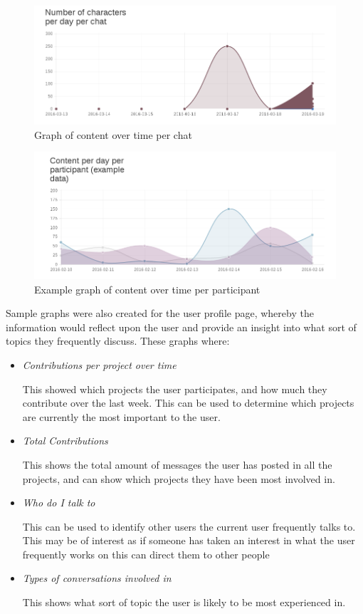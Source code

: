 \documentclass{l4proj}
\begin{document}
\begin{figure}[h]
\includegraphics[scale=0.75]{WorkingGraph.png}
\centering
\caption{Graph of content over time per chat}
\label{fig:3}
\end{figure}


\begin{figure}[h]
\includegraphics[scale=0.75]{SampleGraph.png}
\centering
\caption{Example graph of content over time per participant}
\label{fig:4}

\end{figure}

\newpage
Sample graphs were also created for the user profile page, whereby the information would reflect upon the user and provide an insight into what sort of topics they frequently discuss. These graphs where:

\begin{itemize}
\item \textit{Contributions per project over time} 
\par This showed which projects the user participates, and how much they contribute over the last week.  This can be used to determine which projects are currently the most important to the user.
\item \textit{Total Contributions}
\par This shows the total amount of messages the user has posted in all the projects, and can show which projects they have been most involved in.
\item \textit{Who do I talk to}
\par This can be used to identify other users the current user frequently talks to.  This may be of interest as if someone has taken an interest in what the user frequently works on this can direct them to other people
\item \textit{Types of conversations involved in}
\par This shows what sort of topic the user is likely to be most experienced in. 
\end{itemize}
\end{document}
